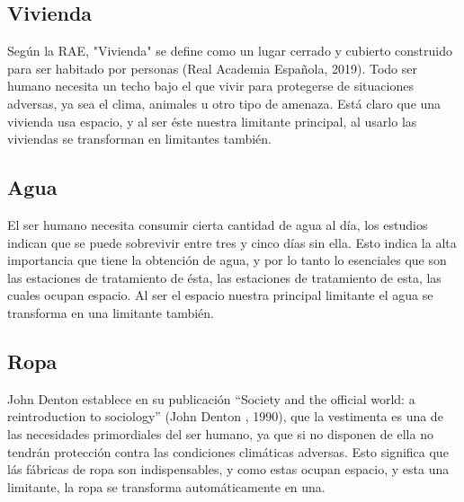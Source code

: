 \documentclass[12pt]{report}
\begin{document}
\subsection*{Vivienda}
Seg\'un la RAE, "Vivienda"  se define como un lugar cerrado y cubierto construido para ser habitado por personas (Real Academia Espa\~nola, 2019). Todo ser humano necesita un techo bajo el que vivir para protegerse de situaciones adversas, ya sea el clima, animales u otro tipo de amenaza. Est\'a claro que una vivienda usa espacio, y al ser \'este nuestra limitante principal, al usarlo las viviendas se transforman en limitantes tambi\'en.
\subsection*{Agua}
El ser humano necesita consumir cierta cantidad de agua al d\'ia, los estudios indican que se puede sobrevivir entre tres y cinco d\'ias sin ella. Esto indica la alta importancia que tiene la obtenci\'on de agua, y por lo tanto lo esenciales que son las estaciones de tratamiento de \'esta, las estaciones de tratamiento de esta, las cuales ocupan espacio. Al ser el espacio nuestra principal limitante el agua se transforma en una limitante tambi\'en. 

\subsection*{Ropa}
John Denton establece en su publicaci\'on ``Society and the official world: a reintroduction to sociology'' (John Denton , 1990), que la vestimenta es una de las necesidades primordiales del ser humano, ya que si no disponen de ella no tendr\'an protecci\'on contra las condiciones clim\'aticas adversas. Esto significa que l\'as f\'abricas de ropa son indispensables, y como estas ocupan espacio, y esta una limitante, la ropa se transforma autom\'aticamente en una.

\end{document}
